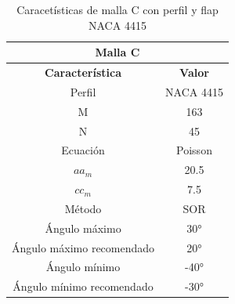 \documentclass[letterpaper, openright, 12pt]{book}
\begin{document}
    \begin{table}[htbp!]
    \begin{center}
        \begin{tabular}{| c | c |}
        \hline
        \multicolumn{2}{|c|}{Malla C}\\

        \hline
        \textbf{Característica} & \textbf{Valor} \\ \hline

        Perfil & NACA 4415
        \\ \hline

        M & 163
        \\ \hline

        N & 45
        \\ \hline

        Ecuación & Poisson
        \\\hline

        $aa_m$ & 20.5
        \\ \hline

        $cc_m$ & 7.5
        \\ \hline

        Método & SOR
        \\\hline

        Ángulo máximo & 30\si{\degree}
        \\ \hline

        Ángulo máximo recomendado & 20\si{\degree}
        \\ \hline

        Ángulo mínimo & -40\si{\degree}
        \\ \hline

        Ángulo mínimo recomendado & -30\si{\degree}
        \\ \hline
        \end{tabular}
        \caption{Caracetísticas de malla C con perfil y flap NACA 4415}
    \label{tabla_c_flap_naca_4415}
    \end{center}
    \end{table}
\end{document}
